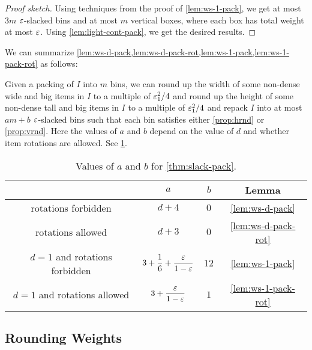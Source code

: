\begin{proof}[Proof sketch]
Using techniques from the proof of \cref{lem:ws-1-pack},
we get at most $3m$ $\varepsilon$-slacked bins and at most $m$ vertical boxes,
where each box has total weight at most $\varepsilon$.
Using \cref{lem:light-cont-pack}, we get the desired results.
\end{proof}

We can summarize \cref{lem:ws-d-pack,lem:ws-d-pack-rot,lem:ws-1-pack,lem:ws-1-pack-rot} as follows:
\begin{theorem}
\label{thm:slack-pack}
Given a packing of $I$ into $m$ bins, we can
round up the width of some non-dense wide and big items in $I$ to a multiple of $\varepsilon_1^2/4$
and round up the height of some non-dense tall and big items in $I$ to a multiple of $\varepsilon_1^2/4$
and repack $I$ into at most $am + b$ $\varepsilon$-slacked bins such that
each bin satisfies either \cref{prop:hrnd} or \cref{prop:vrnd}.
Here the values of $a$ and $b$ depend on the value of $d$ and whether item rotations are allowed.
See \cref{table:slack-pack-ab}.
\begin{table}[H]
\centering
\caption{Values of $a$ and $b$ for \cref{thm:slack-pack}.}
\begin{tabular}{cccc}
\toprule & $a$ & $b$ & Lemma
\\ \midrule rotations forbidden
    & \quad$d+4$
    & $0$
    & \cref{lem:ws-d-pack}
\\[\defaultaddspace] rotations allowed
    & \quad$d+3$
    & $0$
    & \cref{lem:ws-d-pack-rot}
\\[\defaultaddspace] $d=1$ and rotations forbidden
    & \quad${\displaystyle 3 + \frac{1}{6} + \frac{\varepsilon}{1-\varepsilon}}$
    & $12$
    & \cref{lem:ws-1-pack}
\\[\defaultaddspace] $d=1$ and rotations allowed
    & \quad${\displaystyle 3 + \frac{\varepsilon}{1-\varepsilon}}$
    & $1$
    & \cref{lem:ws-1-pack-rot}
\\ \bottomrule
\end{tabular}
\label{table:slack-pack-ab}
\end{table}
\end{theorem}

\subsection{Rounding Weights}
\label{sec:gv-rbbp:round-weights}

